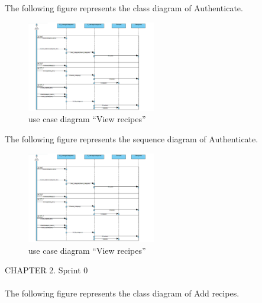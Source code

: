 \documentclass{article}
\begin{document}
{{{The following figure represents the class diagram of Authenticate.\\

\begin{figure}[htbp]
    \centering
    \includegraphics[width=0.5\textwidth]{autdia}
    \caption{use case diagram “View recipes”}
    \label{fig:design2}
\end{figure}
The following figure represents the sequence diagram of Authenticate.\\
\begin{figure}[htbp]
    \centering
    \includegraphics[width=0.5\textwidth]{autdia}
    \caption{use case diagram “View recipes”}
    \label{fig:design2}
\end{figure}
\newpage
\noindent
CHAPTER 2.  Sprint 0 \\
\underline{\hspace{\textwidth}} \vspace{0.2cm}\\
The following figure represents the class diagram of Add recipes.\\

}}}
\end{document}
